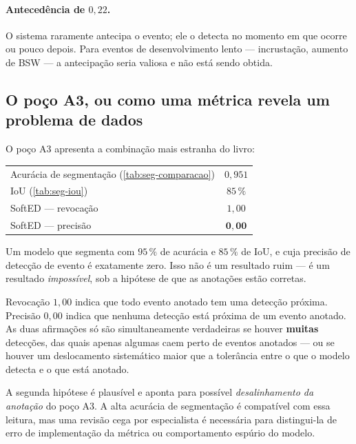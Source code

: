 \paragraph{Antecedência de $0{,}22$.} O sistema raramente antecipa o evento; ele o
detecta no momento em que ocorre ou pouco depois. Para eventos de desenvolvimento lento
--- incrustação, aumento de BSW --- a antecipação seria valiosa e não está sendo obtida.

\subsection{O poço A3, ou como uma métrica revela um problema de dados}

O poço A3 apresenta a combinação mais estranha do livro:

\begin{center}
\small
\begin{tabular}{lc}
\toprule
Acurácia de segmentação (\cref{tab:seg-comparacao}) & $0{,}951$ \\
IoU (\cref{tab:seg-iou})                            & $85\,\%$ \\
SoftED --- revocação                                 & $1{,}00$ \\
SoftED --- precisão                                  & $\bm{0{,}00}$ \\
\bottomrule
\end{tabular}
\end{center}

Um modelo que segmenta com $95\,\%$ de acurácia e $85\,\%$ de IoU, e cuja precisão de
detecção de evento é exatamente zero. Isso não é um resultado ruim --- é um resultado
\emph{impossível}, sob a hipótese de que as anotações estão corretas.

\begin{destaque}
Revocação $1{,}00$ indica que todo evento anotado tem uma detecção próxima. Precisão
$0{,}00$ indica que nenhuma detecção está próxima de um evento anotado. As duas
afirmações só são simultaneamente verdadeiras se houver \textbf{muitas} detecções, das
quais apenas algumas caem perto de eventos anotados --- ou se houver um deslocamento
sistemático maior que a tolerância entre o que o modelo detecta e o que está anotado.

A segunda hipótese é plausível e aponta para possível \emph{desalinhamento da anotação}
do poço A3. A alta acurácia de segmentação é compatível com essa leitura, mas uma revisão
cega por especialista é necessária para distingui-la de erro de implementação da métrica
ou comportamento espúrio do modelo.
\end{destaque}

